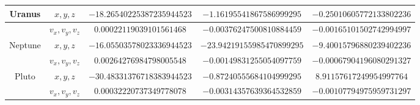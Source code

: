 \begin{table}[h]
{\begin{tabular}{ c c c c c }
  Uranus         &  $x,y,z$         &  $-18.26540225387235944523$ &	$-1.16195541867586999295$ &	 $-0.25010605772133802236$\\\hline
                 &  $v_x,v_y,v_z$   &  $0.00022119039101561468$ & $-0.00376247500810884459$ &	$-0.00165101502742994997$ \\\hline
  Neptune        &  $x,y,z$         &  $-16.05503578023336944523$ &	$-23.94219155985470899295$ &	 $-9.40015796880239402236$    \\\hline
                 &  $v_x,v_y,v_z$   & $0.00264276984798005548$ & $-0.00149831255054097759$ &	$-0.00067904196080291327$     \\\hline
  Pluto          &  $x,y,z$         &  $-30.48331376718383944523$ & $-0.87240555684104999295$ &	 $8.91157617249954997764$ \\\hline
                 &  $v_x,v_y,v_z$   &  $0.00032220737349778078$ & $-0.00314357639364532859$ &	$-0.00107794975959731297$\\\hline       
\end{tabular}}
\end{table}

\begin{table}[h]
\caption{Ilargiaren Lurrarekiko hasierako balioak.}
\label{tab:1}       %
\centering
{}
\end{table}
                 
